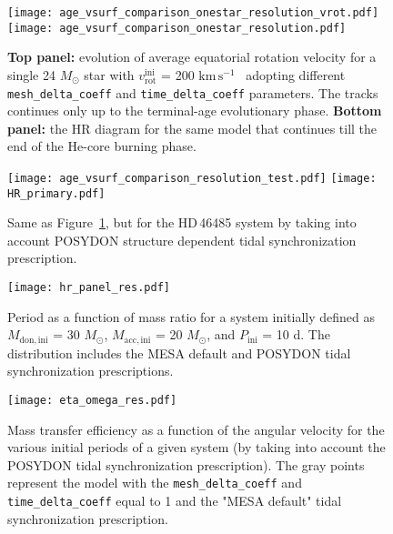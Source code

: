 \documentclass{aa}
\newcommand{\kms}{$\mathrm{km\,s^{-1}}$}
\DeclareRobustCommand{\Figref}[1]{Figure~\ref{#1}}
\begin{document}
\begin{figure}[!ht]
  \centering
  \texttt{[image: age\_vsurf\_comparison\_onestar\_resolution\_vrot.pdf]}
  \texttt{[image: age\_vsurf\_comparison\_onestar\_resolution.pdf]}
  \caption{{\bf Top panel:} evolution of average equatorial rotation
    velocity for a single 24 $M_{\odot}$ star with $v_\mathrm{rot}^\mathrm{ini}$ =
    200 \kms~ adopting different \texttt{mesh\_delta\_coeff} and
    \texttt{time\_delta\_coeff} parameters. The tracks continues only
    up to the terminal-age evolutionary phase.  {\bf Bottom panel:}
    the HR diagram for the same model that continues till the end of
    the He-core burning phase.}
  \label{fig:resolution_test_one_star}
  \script{}
\end{figure}


\begin{figure}[!ht]
  \centering
  \texttt{[image: age\_vsurf\_comparison\_resolution\_test.pdf]}
  \texttt{[image: HR\_primary.pdf]}
  \caption{Same as \Figref{fig:resolution_test_one_star}, but for the HD\,46485 system by taking into account POSYDON structure dependent tidal synchronization prescription.}
  \label{fig:resolution_test_tides}
\end{figure}



\begin{figure}[!ht]
  \centering
  \texttt{[image: hr\_panel\_res.pdf]}
  \caption{Period as a function of mass ratio for a system initially defined as $M_\mathrm{don,ini}$ = 30 $M_{\odot}$, $M_\mathrm{acc,ini}$ = 20 $M_{\odot}$, and $P_\mathrm{ini}$ = 10 d. The distribution includes the MESA default and POSYDON tidal synchronization prescriptions.}
  \label{fig:resolution_test_pvsq}
\end{figure}



\begin{figure}[!ht]
  \centering
  \texttt{[image: eta\_omega\_res.pdf]}
  \caption{Mass transfer efficiency as a function of the angular velocity for the various initial periods of a given system (by taking into account the POSYDON tidal synchronization prescription). The gray points represent the model with the \texttt{mesh\_delta\_coeff} and \texttt{time\_delta\_coeff} equal to 1 and the "MESA default" tidal synchronization prescription.}
  \label{fig:eta_omega_res}
\end{figure}
\end{document}
